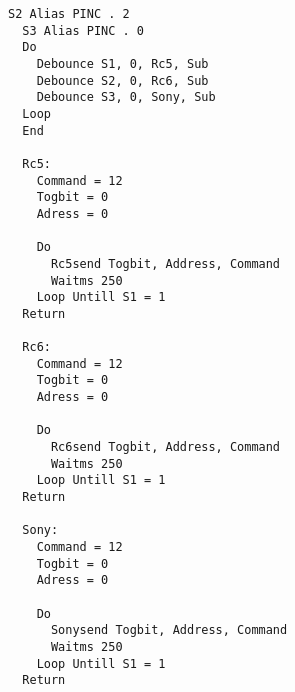 \documentclass{article}
\begin{document}
\begin{lstlisting}[language=VBScript , caption=Kod wysylajacy sygnal (przez podczerwien) w kodzie RC5 RC6 i Sony]
  S2 Alias PINC . 2
  S3 Alias PINC . 0
  Do
    Debounce S1, 0, Rc5, Sub
    Debounce S2, 0, Rc6, Sub
    Debounce S3, 0, Sony, Sub   
  Loop
  End

  Rc5:
    Command = 12
    Togbit = 0
    Adress = 0

    Do
      Rc5send Togbit, Address, Command
      Waitms 250
    Loop Untill S1 = 1
  Return

  Rc6:
    Command = 12
    Togbit = 0
    Adress = 0

    Do
      Rc6send Togbit, Address, Command
      Waitms 250
    Loop Untill S1 = 1
  Return

  Sony:
    Command = 12
    Togbit = 0
    Adress = 0

    Do
      Sonysend Togbit, Address, Command
      Waitms 250
    Loop Untill S1 = 1
  Return
\end{lstlisting}
\end{document}
